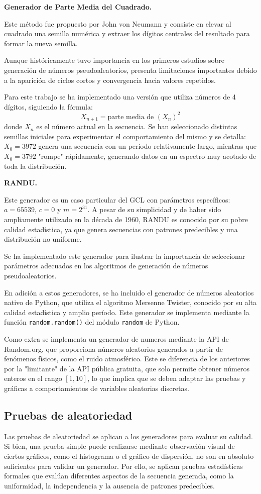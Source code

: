 \documentclass{article}
\begin{document}
\textbf{Generador de Parte Media del Cuadrado.}


Este método fue propuesto por John von Neumann y consiste en elevar al cuadrado una semilla numérica y extraer los dígitos centrales del resultado para formar la nueva semilla.

Aunque históricamente tuvo importancia en los primeros estudios sobre generación de números pseudoaleatorios, presenta limitaciones importantes debido a la aparición de ciclos cortos y convergencia hacia valores repetidos.

Para este trabajo se ha implementado una versión que utiliza números de 4 dígitos, siguiendo la fórmula:
$$X_{n+1} = \text{parte media de } (X_n)^2$$
donde $X_n$ es el número actual en la secuencia. Se han seleccionado distintas semillas iniciales para experimentar el comportamiento del mismo y se detalla:
$X_0 = 3972$ genera una secuencia con un período relativamente largo, mientras que $X_0 = 3792$ "rompe" rápidamente, generando datos en un espectro muy acotado de toda la distribución.

\textbf{RANDU.}

Este generador es un caso particular del GCL con parámetros específicos: $a = 65539$, $c = 0$ y $m = 2^{31}$.
A pesar de su simplicidad y de haber sido ampliamente utilizado en la década de 1960, RANDU es conocido por su pobre calidad estadística, ya que genera secuencias con patrones predecibles y una distribución no uniforme.

Se ha implementado este generador para ilustrar la importancia de seleccionar parámetros adecuados en los algoritmos de generación de números pseudoaleatorios.

En adición a estos generadores, se ha incluido el generador de números aleatorios nativo de Python, que utiliza el algoritmo Mersenne Twister, conocido por su alta calidad estadística y amplio período. Este generador se implementa mediante la función \texttt{random.random()} del módulo \texttt{random} de Python.

Como extra se implementa un generador de numeros mediante la API de Random.org, que proporciona números aleatorios generados a partir de fenómenos físicos, como el ruido atmosférico. Este se diferencia de los anteriores por la "limitante" de la API pública gratuita, que solo permite obtener números enteros en el rango $[1, 10]$, lo que implica que se deben adaptar las pruebas y gráficas a comportamientos de variables aleatorias discretas.

\subsection{Pruebas de aleatoriedad}
Las pruebas de aleatoriedad se aplican a los generadores para evaluar su calidad.
Si bien, una prueba simple puede realizarse mediante observación visual de ciertos gráficos, como el histograma o el gráfico de dispersión, no son en absoluto suficientes para validar un generador.
Por ello, se aplican pruebas estadísticas formales que evalúan diferentes aspectos de la secuencia generada, como la uniformidad, la independencia y la ausencia de patrones predecibles.
\end{document}
